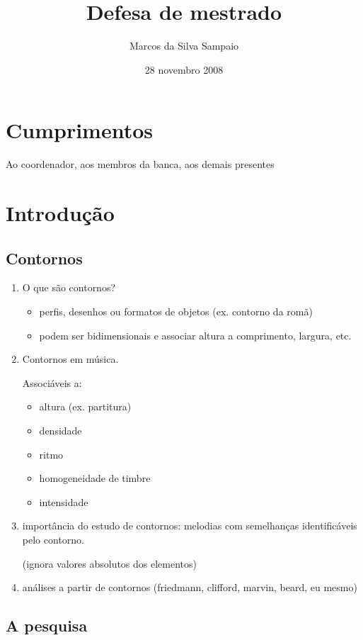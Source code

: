 \documentclass[12pt,a4paper]{article}
\title{Defesa de mestrado}
\author{Marcos da Silva Sampaio}
\date{28 novembro 2008}
\begin{document}
\maketitle
\thispagestyle{empty}

\section*{Cumprimentos}

Ao coordenador, aos membros da banca, aos demais presentes

\section{Introdução}

\subsection{Contornos}

\begin{enumerate}
\item O que são contornos?
  \begin{itemize}
  \item perfis, desenhos ou formatos de objetos (ex. contorno da romã)
  \item podem ser bidimensionais e associar altura a comprimento,
    largura, etc.
  \end{itemize}
\item Contornos em música.

  Associáveis a:
  \begin{itemize}
  \item altura (ex. partitura)
  \item densidade
  \item ritmo
  \item homogeneidade de timbre
  \item intensidade
  \end{itemize}
\item importância do estudo de contornos: melodias com semelhanças
  identificáveis pelo contorno.

  (ignora valores absolutos dos elementos)
\item análises a partir de contornos (friedmann, clifford, marvin, beard, eu mesmo)
\end{enumerate}

\subsection{A pesquisa}
\end{document}
